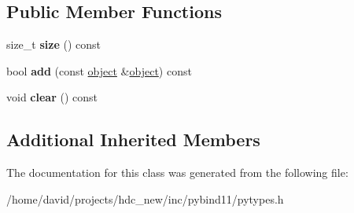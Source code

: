 \subsection*{Public Member Functions}
\begin{DoxyCompactItemize}
\item 
size\+\_\+t {\bfseries size} () const \hypertarget{classset_ab67e328ceca7f716a286931ed173250a}{}\label{classset_ab67e328ceca7f716a286931ed173250a}

\item 
bool {\bfseries add} (const \hyperlink{classobject}{object} \&\hyperlink{classobject}{object}) const \hypertarget{classset_ad0638a74b47fa4f2495ac0e70042bb0c}{}\label{classset_ad0638a74b47fa4f2495ac0e70042bb0c}

\item 
void {\bfseries clear} () const \hypertarget{classset_a09166c4db1620f3aebda67e0c98cce8f}{}\label{classset_a09166c4db1620f3aebda67e0c98cce8f}

\end{DoxyCompactItemize}
\subsection*{Additional Inherited Members}


The documentation for this class was generated from the following file\+:\begin{DoxyCompactItemize}
\item 
/home/david/projects/hdc\+\_\+new/inc/pybind11/pytypes.\+h\end{DoxyCompactItemize}
